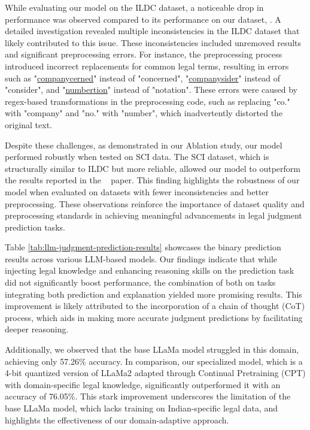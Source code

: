 While evaluating our model on the ILDC dataset, a noticeable drop in performance was observed compared to its performance on our dataset, \texttt{\named}. A detailed investigation revealed multiple inconsistencies in the ILDC dataset that likely contributed to this issue. These inconsistencies included unremoved results and significant preprocessing errors. For instance, the preprocessing process introduced incorrect replacements for common legal terms, resulting in errors such as "\underline{companycerned}" instead of "concerned", "\underline{companysider}" instead of "consider", and "\underline{numbertion}" instead of "notation". These errors were caused by regex-based transformations in the preprocessing code, such as replacing "co." with "company" and "no." with "number", which inadvertently distorted the original text.


Despite these challenges, as demonstrated in our Ablation study, our model performed robustly when tested on SCI data. The SCI dataset, which is structurally similar to ILDC but more reliable, allowed our model to outperform the results reported in the ~\cite{malik-etal-2021-ildc} paper. This finding highlights the robustness of our model when evaluated on datasets with fewer inconsistencies and better preprocessing. These observations reinforce the importance of dataset quality and preprocessing standards in achieving meaningful advancements in legal judgment prediction tasks.

Table \ref{tab:llm-judgment-prediction-results} showcases the binary prediction results across various LLM-based models. Our findings indicate that while injecting legal knowledge and enhancing reasoning skills on the prediction task did not significantly boost performance, the combination of both on tasks integrating both prediction and explanation yielded more promising results. This improvement is likely attributed to the incorporation of a chain of thought (CoT) process, which aids in making more accurate judgment predictions by facilitating deeper reasoning.

Additionally, we observed that the base LLaMa model struggled in this domain, achieving only 57.26\% accuracy. In comparison, our specialized \texttt{\namel} model, which is a 4-bit quantized version of LLaMa2 adapted through Continual Pretraining (CPT) with domain-specific legal knowledge, significantly outperformed it with an accuracy of 76.05\%. This stark improvement underscores the limitation of the base LLaMa model, which lacks training on Indian-specific legal data, and highlights the effectiveness of our domain-adaptive approach.

